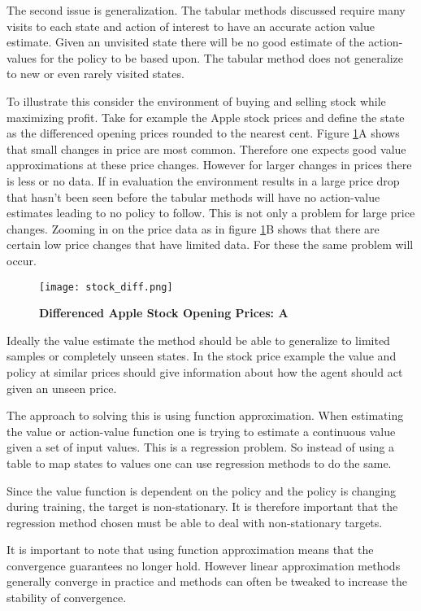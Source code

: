 The second issue is generalization. The tabular methods discussed require many visits to each state and action of interest to have an accurate action value estimate. Given an unvisited state there will be no good estimate of the action-values for the policy to be based upon. The tabular method does not generalize to new or even rarely visited states.

To illustrate this consider the environment of buying and selling stock while maximizing profit. Take for example the Apple stock prices and define the state as the differenced opening prices rounded to the nearest cent. Figure \ref{fig:stock_diff}A shows that small changes in price are most common. Therefore one expects good value approximations at these price changes. However for larger changes in prices there is less or no data. If in evaluation the environment results in a large price drop that hasn't been seen before the tabular methods will have no action-value estimates leading to no policy to follow. This is not only a problem for large price changes. Zooming in on the price data as in figure \ref{fig:stock_diff}B shows that there are certain low price changes that have limited data. For these the same problem will occur.

\begin{figure}[H] %
    \texttt{[image: stock\_diff.png]}
    \caption{\textbf{Differenced Apple Stock Opening Prices: A}}
    \label{fig:stock_diff}
\end{figure}

Ideally the value estimate the method should be able to generalize to limited samples or completely unseen states. In the stock price example the value and policy at similar prices should give information about how the agent should act given an unseen price. 

The approach to solving this is using function approximation. When estimating the value or action-value function one is trying to estimate a continuous value given a set of input values. This is a regression problem. So instead of using a table to map states to values one can use regression methods to do the same. 

Since the value function is dependent on the policy and the policy is changing during training, the target is non-stationary. It is therefore important that the regression method chosen must be able to deal with non-stationary targets.\cite[p.~198-199]{sutton_barto_2018}

It is important to note that using function approximation means that the convergence guarantees no longer hold. However linear approximation methods generally converge in practice and methods can often be tweaked to increase the stability of 
convergence.

